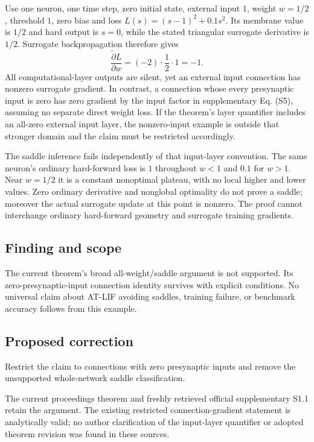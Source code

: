 \documentclass[11pt]{article}
\begin{document}
Use one neuron, one time step, zero initial state, external input \(1\), weight \(w=1/2\), threshold \(1\), zero bias and loss \(L(s)=(s-1)^2+0.1s^2\). Its membrane value is \(1/2\) and hard output is \(s=0\), while the stated triangular surrogate derivative is \(1/2\). Surrogate backpropagation therefore gives \[\frac{\widetilde\partial L}{\partial w}=(-2)\cdot\frac12\cdot1=-1.\] All computational-layer outputs are silent, yet an external input connection has nonzero surrogate gradient. In contrast, a connection whose every presynaptic input is zero has zero gradient by the input factor in supplementary Eq. (S5), assuming no separate direct weight loss. If the theorem’s layer quantifier includes an all-zero external input layer, the nonzero-input example is outside that stronger domain and the claim must be restricted accordingly.

The saddle inference fails independently of that input-layer convention. The same neuron’s ordinary hard-forward loss is \(1\) throughout \(w<1\) and \(0.1\) for \(w>1\). Near \(w=1/2\) it is a constant nonoptimal plateau, with no local higher and lower values. Zero ordinary derivative and nonglobal optimality do not prove a saddle; moreover the actual surrogate update at this point is nonzero. The proof cannot interchange ordinary hard-forward geometry and surrogate training gradients.

\subsection*{Finding and scope}

The current theorem’s broad all-weight/saddle argument is not supported. Its zero-presynaptic-input connection identity survives with explicit conditions. No universal claim about AT-LIF avoiding saddles, training failure, or benchmark accuracy follows from this example.

\subsection*{Proposed correction}

Restrict the claim to connections with zero presynaptic inputs and remove the unsupported whole-network saddle classification.

The current proceedings theorem and freshly retrieved official supplementary S1.1 retain the argument. The existing restricted connection-gradient statement is analytically valid; no author clarification of the input-layer quantifier or adopted theorem revision was found in these sources.
\end{document}
